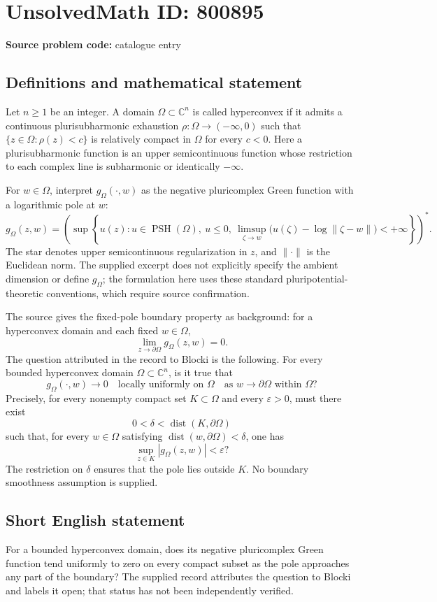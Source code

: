 \documentclass[11pt]{article}
\newcommand{\C}{\mathbb{C}}
\begin{document}
\section*{UnsolvedMath ID: 800895}
\textbf{Source problem code:} catalogue entry
\subsection{Definitions and mathematical statement}
Let \(n\geq 1\) be an integer. A domain \(\Omega\subset\C^n\) is called hyperconvex if it admits a continuous plurisubharmonic exhaustion \(\rho:\Omega\to(-\infty,0)\) such that \(\{z\in\Omega:\rho(z)<c\}\) is relatively compact in \(\Omega\) for every \(c<0\). Here a plurisubharmonic function is an upper semicontinuous function whose restriction to each complex line is subharmonic or identically \(-\infty\).

For \(w\in\Omega\), interpret \(g_\Omega(\cdot,w)\) as the negative pluricomplex Green function with a logarithmic pole at \(w\):
\[
 g_\Omega(z,w)=\left(\sup\left\{u(z):u\in\operatorname{PSH}(\Omega),\ u\leq0,\ \limsup_{\zeta\to w}\bigl(u(\zeta)-\log\|\zeta-w\|\bigr)<+\infty\right\}\right)^*.
\]
The star denotes upper semicontinuous regularization in \(z\), and \(\|\cdot\|\) is the Euclidean norm. The supplied excerpt does not explicitly specify the ambient dimension or define \(g_\Omega\); the formulation here uses these standard pluripotential-theoretic conventions, which require source confirmation.

The source gives the fixed-pole boundary property as background: for a hyperconvex domain and each fixed \(w\in\Omega\),
\[
 \lim_{z\to\partial\Omega}g_\Omega(z,w)=0.
\]
The question attributed in the record to Blocki is the following. For every bounded hyperconvex domain \(\Omega\subset\C^n\), is it true that
\[
 g_\Omega(\cdot,w)\longrightarrow0\quad\text{locally uniformly on }\Omega
 \quad\text{as }w\to\partial\Omega\text{ within }\Omega?
\]
Precisely, for every nonempty compact set \(K\subset\Omega\) and every \(\varepsilon>0\), must there exist
\[
 0<\delta<\operatorname{dist}(K,\partial\Omega)
\]
such that, for every \(w\in\Omega\) satisfying \(\operatorname{dist}(w,\partial\Omega)<\delta\), one has
\[
 \sup_{z\in K}|g_\Omega(z,w)|<\varepsilon?
\]
The restriction on \(\delta\) ensures that the pole lies outside \(K\). No boundary smoothness assumption is supplied.
\subsection{Short English statement}
For a bounded hyperconvex domain, does its negative pluricomplex Green function tend uniformly to zero on every compact subset as the pole approaches any part of the boundary? The supplied record attributes the question to Blocki and labels it open; that status has not been independently verified.
\end{document}

